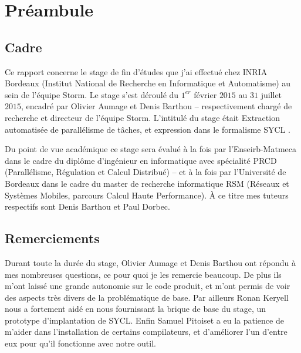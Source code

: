 \documentclass[11pt,onecolumn]{report}
\begin{document}


\tableofcontents

\chapter*{Préambule}

\section*{Cadre}

Ce rapport concerne le stage de fin d'études que j'ai effectué chez INRIA Bordeaux (Institut National de Recherche en Informatique et Automatisme) au sein de l'équipe Storm. Le stage s'est déroulé du $1^{er}$ février $2015$ au $31$ juillet $2015$, encadré par Olivier Aumage et Denis Barthou -- respectivement chargé de recherche et directeur de l'équipe Storm. L'intitulé du stage était \og Extraction automatisée de parallélisme de tâches, et expression dans le formalisme SYCL \fg.

Du point de vue académique ce stage sera évalué à la fois par l'Enseirb-Matmeca dans le cadre du diplôme d'ingénieur en informatique avec spécialité PRCD (Parallélisme, Régulation et Calcul Distribué) -- et à la fois par l'Université de Bordeaux dans le cadre du master de recherche informatique RSM (Réseaux et Systèmes Mobiles, parcours Calcul Haute Performance). À ce titre mes tuteurs respectifs sont Denis Barthou et Paul Dorbec.

\section*{Remerciements}

Durant toute la durée du stage, Olivier Aumage et Denis Barthou ont répondu à mes nombreuses questions, ce pour quoi je les remercie beaucoup. De plus ils m'ont laissé une grande autonomie sur le code produit, et m'ont permis de voir des aspects très divers de la problématique de base. Par ailleurs Ronan Keryell nous a fortement aidé en nous fournissant la brique de base du stage, un prototype d'implantation de SYCL. Enfin Samuel Pitoiset a eu la patience de m'aider dans l'installation de certains compilateurs, et d'améliorer l'un d'entre eux pour qu'il fonctionne avec notre outil.



\end{document}
